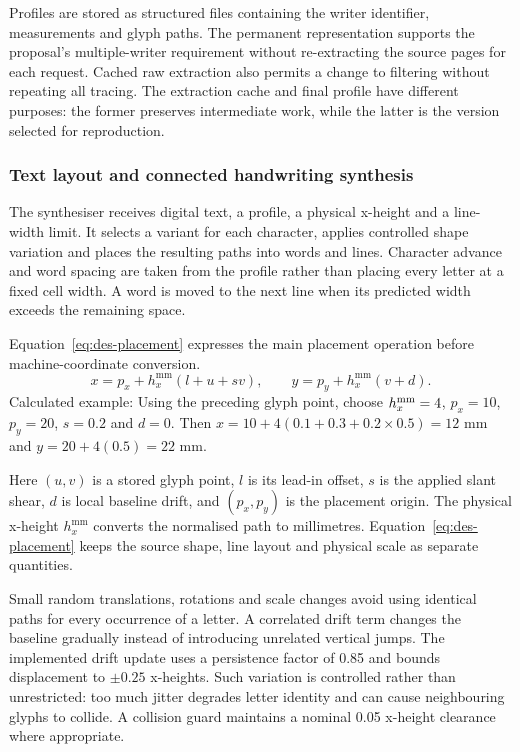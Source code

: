 Profiles are stored as structured files containing the writer identifier, measurements and glyph paths. The permanent representation supports the proposal's multiple-writer requirement without re-extracting the source pages for each request. Cached raw extraction also permits a change to filtering without repeating all tracing. The extraction cache and final profile have different purposes: the former preserves intermediate work, while the latter is the version selected for reproduction.~\cite[style.py; synthesise.py; reproduce.py]{braunepipeline2026}

\subsubsection{Text layout and connected handwriting synthesis}
\label{sec:des-layout}
The synthesiser receives digital text, a profile, a physical x-height and a line-width limit. It selects a variant for each character, applies controlled shape variation and places the resulting paths into words and lines. Character advance and word spacing are taken from the profile rather than placing every letter at a fixed cell width. A word is moved to the next line when its predicted width exceeds the remaining space.~\cite[style.py; synthesise.py; reproduce.py]{braunepipeline2026}


Equation~\ref{eq:des-placement} expresses the main placement operation before machine-coordinate conversion.
\begin{equation}
x=p_x+h_x^{\mathrm{mm}}(l+u+sv),\qquad
y=p_y+h_x^{\mathrm{mm}}(v+d).
\label{eq:des-placement}
\end{equation}
Calculated example: Using the preceding glyph point, choose $h_x^{\rm mm}=4$, $p_x=10$, $p_y=20$, $s=0.2$ and $d=0$. Then $x=10+4(0.1+0.3+0.2\times0.5)=12$ mm and $y=20+4(0.5)=22$ mm. \cite[synthesise.py, SynthesizeText]{braunepipeline2026}

Here $(u,v)$ is a stored glyph point, $l$ is its lead-in offset, $s$ is the applied slant shear, $d$ is local baseline drift, and $(p_x,p_y)$ is the placement origin. The physical x-height $h_x^{\mathrm{mm}}$ converts the normalised path to millimetres. Equation~\ref{eq:des-placement} keeps the source shape, line layout and physical scale as separate quantities.~\cite[style.py; synthesise.py; reproduce.py]{braunepipeline2026}

Small random translations, rotations and scale changes avoid using identical paths for every occurrence of a letter. A correlated drift term changes the baseline gradually instead of introducing unrelated vertical jumps. The implemented drift update uses a persistence factor of 0.85 and bounds displacement to $\pm0.25$ x-heights. Such variation is controlled rather than unrestricted: too much jitter degrades letter identity and can cause neighbouring glyphs to collide. A collision guard maintains a nominal 0.05 x-height clearance where appropriate.~\cite[style.py; synthesise.py; reproduce.py]{braunepipeline2026}

